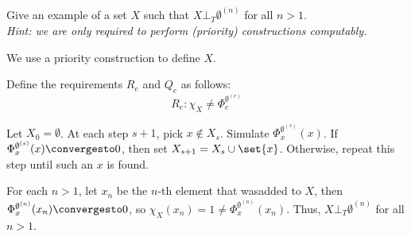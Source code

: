 \begin{problem}
  Give an example of a set $X$ such that $X \bot_T \emptyset^{(n)}$
  for all $n > 1$. \\
  \emph{
    Hint: we are only required to perform
    (priority) constructions computably.
  }

  \begin{answer}
    We use a priority construction to define $X$.


    Define the requirements $R_e$ and $Q_e$ as follows:
    \[
      R_e : \chi_X \neq \Phi_e^{\emptyset^{(e)}}
    \]

    Let $X_0 = \emptyset$.
    At each step $s+1$, pick $x \not \in X_s$.
    Simulate $\Phi_x^{\emptyset^{(s)}}(x)$.
    If $\Phi_x^{\emptyset^{(s)}}(x) \convergesto 0$, then
    set $X_{s+1} = X_s \cup \set{x}$.
    Otherwise, repeat this step until such an $x$ is found.

    \step
    For each $n > 1$, let $x_n$ be the $n$-th element that wasadded to $X$,
    then $\Phi_x^{\emptyset^{(n)}}(x_n) \convergesto 0$, so
    $\chi_X(x_n) = 1 \neq \Phi_x^{\emptyset^{(n)}}(x_n)$.
    Thus, $X \bot_T \emptyset^{(n)}$ for all $n > 1$.
  \end{answer}
\end{problem}
